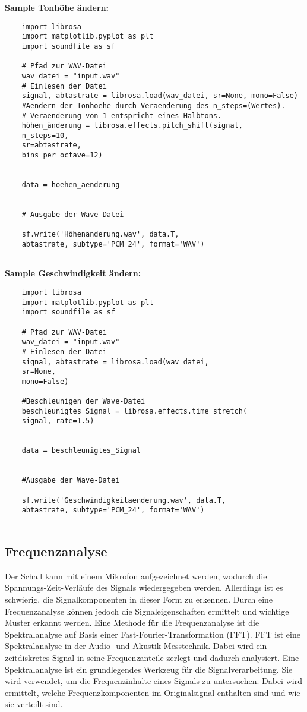 \bigskip

\textbf{Sample Tonhöhe ändern:}
\begin{verbatim}
    import librosa
    import matplotlib.pyplot as plt
    import soundfile as sf
    
    # Pfad zur WAV-Datei
    wav_datei = "input.wav"
    # Einlesen der Datei
    signal, abtastrate = librosa.load(wav_datei, sr=None, mono=False)
    #Aendern der Tonhoehe durch Veraenderung des n_steps=(Wertes). 
    # Veraenderung von 1 entspricht eines Halbtons.
    höhen_änderung = librosa.effects.pitch_shift(signal, 
    n_steps=10,
    sr=abtastrate,
    bins_per_octave=12)
    
    
    data = hoehen_aenderung
    
    
    # Ausgabe der Wave-Datei
    
    sf.write('Höhenänderung.wav', data.T, 
    abtastrate, subtype='PCM_24', format='WAV')
    
\end{verbatim}


\textbf{Sample Geschwindigkeit ändern:}
\begin{verbatim}
    import librosa
    import matplotlib.pyplot as plt
    import soundfile as sf
    
    # Pfad zur WAV-Datei
    wav_datei = "input.wav"
    # Einlesen der Datei
    signal, abtastrate = librosa.load(wav_datei, 
    sr=None, 
    mono=False)
    
    #Beschleunigen der Wave-Datei
    beschleunigtes_Signal = librosa.effects.time_stretch(
    signal, rate=1.5)
    
    
    data = beschleunigtes_Signal
    
    
    #Ausgabe der Wave-Datei
    
    sf.write('Geschwindigkeitaenderung.wav', data.T, 
    abtastrate, subtype='PCM_24', format='WAV')
    
\end{verbatim}





\subsection{Frequenzanalyse}\label{Frequenzanalyse}
Der Schall kann mit einem Mikrofon aufgezeichnet werden, wodurch die Spannungs-Zeit-Verläufe des Signals wiedergegeben werden.
Allerdings ist es schwierig, die Signalkomponenten in dieser Form zu erkennen.
Durch eine Frequenzanalyse können jedoch die Signaleigenschaften ermittelt und wichtige Muster erkannt werden.
Eine Methode für die Frequenzanalyse ist die Spektralanalyse auf Basis einer Fast-Fourier-Transformation (FFT). 
FFT ist eine Spektralanalyse in der Audio- und Akustik-Messtechnik.
Dabei wird ein zeitdiskretes Signal in seine Frequenzanteile zerlegt und dadurch analysiert.
Eine Spektralanalyse ist ein grundlegendes Werkzeug für die Signalverarbeitung. 
Sie wird verwendet, um die Frequenzinhalte eines Signals zu untersuchen. 
Dabei wird ermittelt, welche Frequenzkomponenten im Originalsignal enthalten sind und wie sie verteilt sind. 

